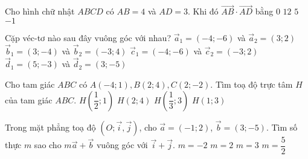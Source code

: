 \begin{ex}%
	Cho hình chữ nhật $ABCD$ có $AB = 4$ và $AD = 3$. Khi đó $\overrightarrow{AB}\cdot \overrightarrow{AD}$ bằng
	\choice
	{\True $0$}
	{$12$}
	{$5$}
	{$-1$}
\end{ex}

\begin{ex}%
	Cặp véc-tơ nào sau đây vuông góc với nhau?
	\choice
	{$\overrightarrow{a}_1=(-4;-6)$ và $\overrightarrow{a}_2=(3;2)$}
	{$\overrightarrow{b}_1=(3;-4)$ và $\overrightarrow{b}_2=(-3;4)$}
	{\True $\overrightarrow{c}_1=(-4;-6)$ và $\overrightarrow{c}_2=(-3;2)$}
	{$\overrightarrow{d}_1=(5;-3)$ và $\overrightarrow{d}_2=(3;-5)$}
\end{ex}

\begin{ex}%
	Cho tam giác $ABC$ có $A(-4;1), B(2;4),C(2;-2)$. Tìm toạ độ trực tâm $H$ của tam giác $ABC$.
	\choice
	{\True $H\left(\dfrac{1}{2};1\right)$}
	{$H(2;4)$}
	{$H\left(\dfrac{1}{3};3\right)$}
	{$H(1;3)$}
\end{ex}

\begin{ex}%
	Trong mặt phẳng toạ độ $\left(O; \overrightarrow{i}, \overrightarrow{j}\right)$, cho $\overrightarrow{a}=(-1;2)$, $\overrightarrow{b}=(3;-5)$. Tìm số thực $m$ sao cho $m\overrightarrow{a}+\overrightarrow{b}$ vuông góc với $\overrightarrow{i}+\overrightarrow{j}$.
	\choice
	{$m=-2$}
	{\True $m=2$}
	{$m=3$}
	{$m=\dfrac{5}{2}$}
\end{ex}

